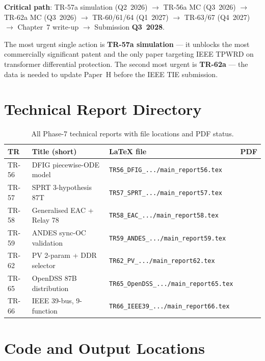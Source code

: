 \documentclass[12pt,a4paper]{article}
\newcommand{\cmark}{\ding{51}}
\newcommand{\xmark}{\ding{55}}
\begin{document}
\noindent\textbf{Critical path}: TR-57a simulation (Q2~2026)
$\to$ TR-56a MC (Q3~2026)
$\to$ TR-62a MC (Q3~2026)
$\to$ TR-60/61/64 (Q1~2027)
$\to$ TR-63/67 (Q4~2027)
$\to$ Chapter~7 write-up
$\to$ Submission \textbf{Q3~2028}.

\bigskip

\noindent The most urgent single action is \textbf{TR-57a simulation} — it unblocks the
most commercially significant patent and the only paper targeting IEEE TPWRD on
transformer differential protection.  The second most urgent is \textbf{TR-62a} —
the data is needed to update Paper~H before the IEEE TIE submission.

\appendix
\section{Technical Report Directory}
\label{app:trs}

\begin{table}[H]
\centering
\caption{All Phase-7 technical reports with file locations and PDF status.}
\begin{tabular}{lllc}
\toprule
TR & Title (short) & LaTeX file & PDF \\
\midrule
TR-56 & DFIG piecewise-ODE model & \texttt{TR56\_DFIG\_.../main\_report56.tex} & \cmark \\
TR-57 & SPRT 3-hypothesis 87T & \texttt{TR57\_SPRT\_.../main\_report57.tex} & \cmark \\
TR-58 & Generalised EAC + Relay 78 & \texttt{TR58\_EAC\_.../main\_report58.tex} & \cmark \\
TR-59 & ANDES sync-OC validation & \texttt{TR59\_ANDES\_.../main\_report59.tex} & \xmark \\
TR-62 & PV 2-param + DDR selector & \texttt{TR62\_PV\_.../main\_report62.tex} & \cmark \\
TR-65 & OpenDSS 87B distribution & \texttt{TR65\_OpenDSS\_.../main\_report65.tex} & \cmark \\
TR-66 & IEEE 39-bus, 9-function & \texttt{TR66\_IEEE39\_.../main\_report66.tex} & \cmark \\
\bottomrule
\end{tabular}
\end{table}

\section{Code and Output Locations}
\label{app:code}
\end{document}
